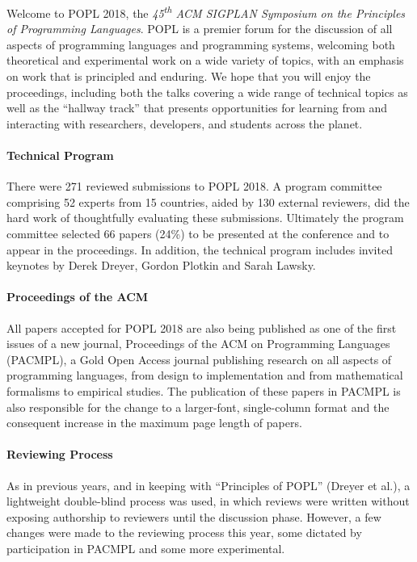 \label{Preface}


\newcommand\person[1]{{#1}}

\noindent

Welcome to POPL 2018, the
\emph{45\textsuperscript{th} ACM SIGPLAN Symposium
on the Principles of Programming Languages}.
%
POPL is a premier forum for the discussion of all aspects
of programming languages and programming systems, welcoming
both theoretical and experimental work on a wide variety of
topics, with an emphasis on work that is principled and enduring.
%
We hope that you will enjoy the proceedings,
including both the talks covering a wide range
of technical topics as well as the ``hallway track''
that presents opportunities for learning from
and interacting with researchers, developers,
and students across the planet.


\paragraph{Technical Program}
%
There were 271 reviewed submissions to POPL 2018.
%
A program committee comprising 52 experts from 15 countries,
aided by 130 external reviewers, did the hard work of
thoughtfully evaluating these submissions.
%
Ultimately the program committee selected 66 papers (24\%)
to be presented at the conference and to appear in the
proceedings.
%
In addition, the technical program includes invited keynotes
by Derek Dreyer, Gordon Plotkin and Sarah Lawsky.

\paragraph{Proceedings of the ACM}
%
All papers accepted for POPL 2018 are also being published as one
of the first issues of a new journal, Proceedings of the ACM on
Programming Languages (PACMPL), a Gold Open Access journal publishing
research on all aspects of programming languages, from design to
implementation and from mathematical formalisms to empirical studies.
The publication of these papers in PACMPL is also responsible for
the change to a larger-font, single-column format and the consequent
increase in the maximum page length of papers.

\paragraph{Reviewing Process}
%
As in previous years, and in keeping with ``Principles of POPL'' (Dreyer et
al.), a lightweight double-blind process was used, in which reviews were
written without exposing authorship to reviewers until the discussion phase.
However, a few changes were made to the reviewing process this year,
some dictated by participation in PACMPL and some more experimental.

